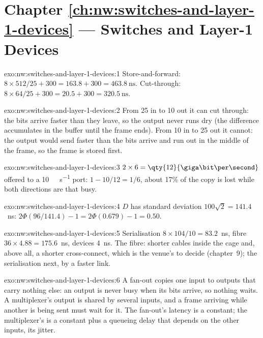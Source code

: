 \section*{Chapter \ref{ch:nw:switches-and-layer-1-devices} --- Switches and Layer-1 Devices}

\begin{solution}{exo:nw:switches-and-layer-1-devices:1}
Store-and-forward: $8 \times 512 / 25 + 300 = 163.8 + 300 = \qty{463.8}{\nano\second}$. Cut-through:
$8 \times 64 / 25 + 300 = 20.5 + 300 = \qty{320.5}{\nano\second}$.
\end{solution}

\begin{solution}{exo:nw:switches-and-layer-1-devices:2}
From 25 in to 10 out it can cut through: the bits arrive faster than they leave, so the output never runs dry (the difference
accumulates in the buffer until the frame ends). From 10 in to 25 out it cannot: the output would send faster than the bits
arrive and run out in the middle of the frame, so the frame is stored first.
\end{solution}

\begin{solution}{exo:nw:switches-and-layer-1-devices:3}
$2 \times 6 = \qty{12}{\giga\bit\per\second}$ offered to a \qty{10}{\giga\bit\per\second} port: $1 - 10/12 = 1/6$, about 17\% of
the copy is lost while both directions are that busy.
\end{solution}

\begin{solution}{exo:nw:switches-and-layer-1-devices:4}
$D$ has standard deviation $100\sqrt2 = 141.4$~ns: $2\Phi(96/141.4) - 1 = 2\Phi(0.679) - 1 = 0.50$.
\end{solution}

\begin{solution}{exo:nw:switches-and-layer-1-devices:5}
Serialisation $8 \times 104/10 = 83.2$~ns, fibre $36 \times 4.88 = 175.6$~ns, devices 4~ns. The fibre: shorter cables inside the cage
and, above all, a shorter cross-connect, which is the venue's to decide (chapter~9); the serialisation next, by a faster link.
\end{solution}

\begin{solution}{exo:nw:switches-and-layer-1-devices:6}
A fan-out copies one input to outputs that carry nothing else: an output is never busy when its bits arrive, so nothing waits. A
multiplexer's output is shared by several inputs, and a frame arriving while another is being sent must wait for it. The fan-out's
latency is a constant; the multiplexer's is a constant plus a queueing delay that depends on the other inputs, its jitter.
\end{solution}

